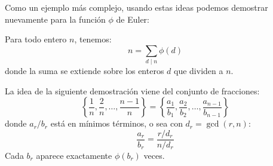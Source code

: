   Como un ejemplo más complejo,
  usando estas ideas podemos demostrar nuevamente
  para la función \(\phi\) de Euler:
  \begin{theorem}
    \label{theo:Gauss-identity-2}
    Para todo entero \(n\),
    tenemos:
    \begin{equation*}
      n = \sum_{d \mid n} \phi(d)
    \end{equation*}
    donde la suma se extiende
    sobre los enteros \(d\) que dividen a \(n\).
  \end{theorem}
  La idea de la siguiente demostración
  viene del conjunto de fracciones:
  \begin{equation*}
    \left\{ \frac{1}{n}, \frac{2}{n},
	    \dotsc, \frac{n - 1}{n} \right\}
      = \left\{
	  \frac{a_1}{b_1}, \frac{a_2}{b_2}, \dotsc,
	    \frac{a_{n - 1}}{b_{n - 1}}
	\right\}
  \end{equation*}
  donde \(a_r / b_r\) está en mínimos términos,
  o sea con \(d_r = \gcd(r, n)\):
  \begin{equation*}
    \frac{a_r}{b_r}
      = \frac{r / d_r}{n / d_r}
  \end{equation*}
  Cada \(b_r\) aparece exactamente \(\phi(b_r)\) veces.
